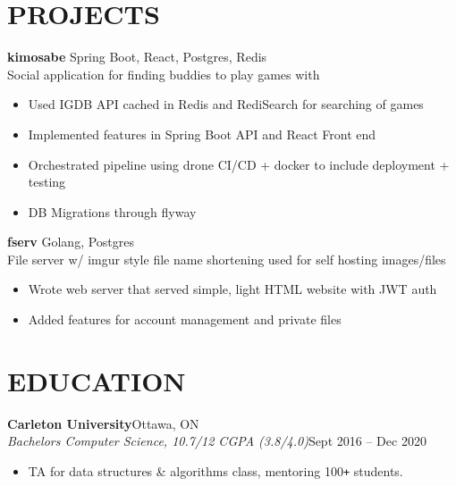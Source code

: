 \documentclass[letterpaper]{article}
\newcommand{\NewPart}[1]{\section*{\large\uppercase{\textbf{#1}}}}
\newcommand{\JobEntry}[3]{
	\normalsize\textbf{#1}\hfill\normalsize{#2}\\
	#3\vspace{0.1cm}
}
\newcommand{\DatedEntry}[3]{
	\small\textit{#1}\hfill\small{#2}\\
	\vspace{0.1cm}#3\vspace{0.1cm}
}
\newcommand{\ProjectEntry}[4]{\textbf{#1}
	\hfill \small{#2}\\
	#3\\\vspace{0.1cm}
	#4\vspace{0.1cm}
}
\begin{document}
\vspace{-0.3cm}

\NewPart{Projects}
\ProjectEntry{kimosabe}
{Spring Boot, React, Postgres, Redis}
{Social application for finding buddies to play games with}
{\begin{itemize}
	\item Used IGDB API cached in Redis and RediSearch for searching of games
	\item Implemented features in Spring Boot API and React Front end
	\item Orchestrated pipeline using drone CI/CD + docker to include deployment + testing
	\item DB Migrations through flyway
\end{itemize}}
\ProjectEntry{fserv}
{Golang, Postgres}
{File server w/ imgur style file name shortening used for self hosting images/files}
{\begin{itemize}
	\item Wrote web server that served simple, light HTML website with JWT auth
	\item Added features for account management and private files
\end{itemize}}\vspace{-0.3cm}

\NewPart{Education}
\JobEntry {Carleton University} {Ottawa, ON}
{\DatedEntry
{Bachelors Computer Science, 10.7/12 CGPA (3.8/4.0)}
{Sept 2016 -- Dec 2020}
{\begin{itemize}
	\item TA for data structures \& algorithms class, mentoring 100\texttt{+} students.
\end{itemize}}
}
\end{document}
